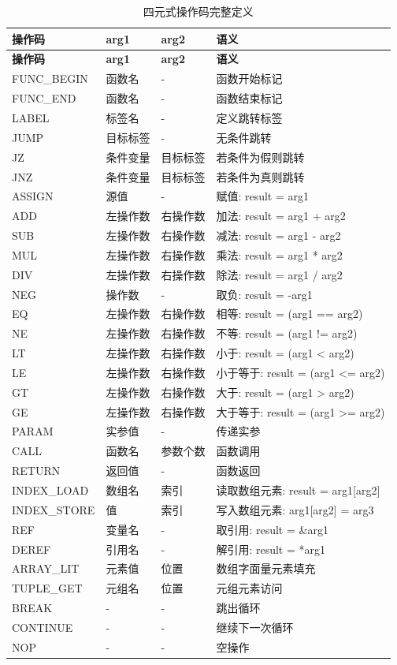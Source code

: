 \documentclass[12pt,a4paper]{ctexart}
\begin{document}
\begin{longtable}{|l|l|l|l|}
\caption{四元式操作码完整定义} \\
\hline
\textbf{操作码} & \textbf{arg1} & \textbf{arg2} & \textbf{语义} \\
\hline
\endfirsthead
\hline
\textbf{操作码} & \textbf{arg1} & \textbf{arg2} & \textbf{语义} \\
\hline
\endhead
\hline
\endfoot
\hline
\endlastfoot

FUNC\_BEGIN & 函数名 & - & 函数开始标记 \\
FUNC\_END & 函数名 & - & 函数结束标记 \\
\hline
LABEL & 标签名 & - & 定义跳转标签 \\
JUMP & 目标标签 & - & 无条件跳转 \\
JZ & 条件变量 & 目标标签 & 若条件为假则跳转 \\
JNZ & 条件变量 & 目标标签 & 若条件为真则跳转 \\
\hline
ASSIGN & 源值 & - & 赋值: result = arg1 \\
ADD & 左操作数 & 右操作数 & 加法: result = arg1 + arg2 \\
SUB & 左操作数 & 右操作数 & 减法: result = arg1 - arg2 \\
MUL & 左操作数 & 右操作数 & 乘法: result = arg1 * arg2 \\
DIV & 左操作数 & 右操作数 & 除法: result = arg1 / arg2 \\
NEG & 操作数 & - & 取负: result = -arg1 \\
\hline
EQ & 左操作数 & 右操作数 & 相等: result = (arg1 == arg2) \\
NE & 左操作数 & 右操作数 & 不等: result = (arg1 != arg2) \\
LT & 左操作数 & 右操作数 & 小于: result = (arg1 < arg2) \\
LE & 左操作数 & 右操作数 & 小于等于: result = (arg1 <= arg2) \\
GT & 左操作数 & 右操作数 & 大于: result = (arg1 > arg2) \\
GE & 左操作数 & 右操作数 & 大于等于: result = (arg1 >= arg2) \\
\hline
PARAM & 实参值 & - & 传递实参 \\
CALL & 函数名 & 参数个数 & 函数调用 \\
RETURN & 返回值 & - & 函数返回 \\
\hline
INDEX\_LOAD & 数组名 & 索引 & 读取数组元素: result = arg1[arg2] \\
INDEX\_STORE & 值 & 索引 & 写入数组元素: arg1[arg2] = arg3 \\
REF & 变量名 & - & 取引用: result = \&arg1 \\
DEREF & 引用名 & - & 解引用: result = *arg1 \\
ARRAY\_LIT & 元素值 & 位置 & 数组字面量元素填充 \\
TUPLE\_GET & 元组名 & 位置 & 元组元素访问 \\
\hline
BREAK & - & - & 跳出循环 \\
CONTINUE & - & - & 继续下一次循环 \\
NOP & - & - & 空操作 \\
\hline
\end{longtable}
\end{document}
